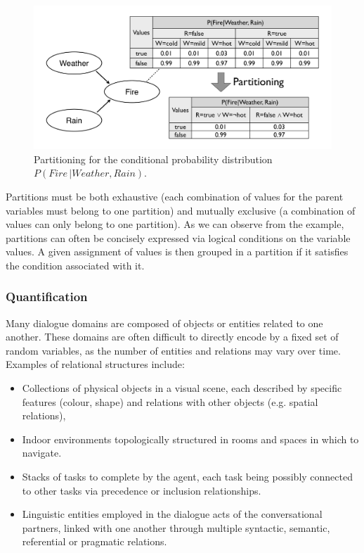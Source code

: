 

 \begin{figure}[h]
\centering
\includegraphics[scale=0.25]{imgs/partitioning.pdf}
\caption{Partitioning for the conditional probability distribution $P(\mathit{Fire} \, | \mathit{Weather}, \mathit{Rain})$.}
\label{fig:partitioning}
\end{figure}

Partitions must be both exhaustive (each combination of values for the parent variables must belong to one partition) and mutually exclusive (a combination of values can only belong to one partition).  As we can observe from the example, partitions can often be concisely expressed via logical conditions on the variable values.  A given assignment of values is then grouped in a partition if it satisfies the condition associated with it.

\subsubsection*{Quantification}

Many dialogue domains are composed of objects or entities related to one another. These domains are often difficult to directly encode by a fixed set of random variables, as the number of entities and relations may vary over time.  Examples of relational structures include: 
\begin{itemize}
\item Collections of physical objects in a visual scene, each described by specific features (colour, shape) and relations with other objects (e.g. spatial relations),
\item Indoor environments topologically structured in rooms and spaces in which to navigate. 
\item Stacks of tasks to complete by the agent, each task being possibly connected to other tasks via precedence or inclusion relationships.
\item Linguistic entities employed in the dialogue acts of the conversational partners, linked with one another through multiple syntactic, semantic, referential or pragmatic relations. 
\end{itemize}

